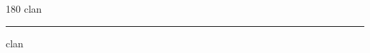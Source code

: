 
\begin{frame}
\begin{center}
\begin{turn}{180}
{\fontsize{2.5cm}{1em}\selectfont clan}
\end{turn}
\vspace{1em}\par  
\hrule
\vspace{1em}\par  
{\fontsize{2.5cm}{1em}\selectfont clan}
\end{center}
\end{frame}
